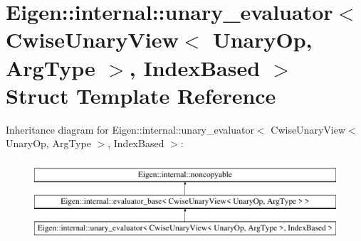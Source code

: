 \hypertarget{struct_eigen_1_1internal_1_1unary__evaluator_3_01_cwise_unary_view_3_01_unary_op_00_01_arg_type_01_4_00_01_index_based_01_4}{}\section{Eigen\+::internal\+::unary\+\_\+evaluator$<$ Cwise\+Unary\+View$<$ Unary\+Op, Arg\+Type $>$, Index\+Based $>$ Struct Template Reference}
\label{struct_eigen_1_1internal_1_1unary__evaluator_3_01_cwise_unary_view_3_01_unary_op_00_01_arg_type_01_4_00_01_index_based_01_4}
Inheritance diagram for Eigen\+::internal\+::unary\+\_\+evaluator$<$ Cwise\+Unary\+View$<$ Unary\+Op, Arg\+Type $>$, Index\+Based $>$\+:\begin{figure}[H]
\begin{center}
\leavevmode
\includegraphics[height=3.000000cm]{struct_eigen_1_1internal_1_1unary__evaluator_3_01_cwise_unary_view_3_01_unary_op_00_01_arg_type_01_4_00_01_index_based_01_4}
\end{center}
\end{figure}
